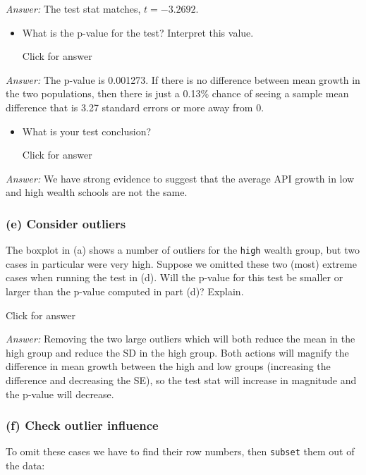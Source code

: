 \documentclass[
]{book}
\providecommand{\tightlist}{%
  \setlength{\itemsep}{0pt}\setlength{\parskip}{0pt}}
\begin{document}
\emph{Answer:} The test stat matches, \(t = -3.2692\).

\begin{itemize}
\tightlist
\item
  What is the p-value for the test? Interpret this value.

  Click for answer
\end{itemize}

\emph{Answer:} The p-value is 0.001273. If there is no difference between mean growth in the two populations, then there is just a 0.13\% chance of seeing a sample mean difference that is 3.27 standard errors or more away from 0.

\begin{itemize}
\tightlist
\item
  What is your test conclusion?

  Click for answer
\end{itemize}

\emph{Answer:} We have strong evidence to suggest that the average API growth in low and high wealth schools are not the same.

\hypertarget{e-consider-outliers}{%
\subsubsection{(e) Consider outliers}\label{e-consider-outliers}}

The boxplot in (a) shows a number of outliers for the \texttt{high} wealth group, but two cases in particular were very high. Suppose we omitted these two (most) extreme cases when running the test in (d). Will the p-value for this test be smaller or larger than the p-value computed in part (d)? Explain.

Click for answer

\emph{Answer:} Removing the two large outliers which will both reduce the mean in the high group and reduce the SD in the high group. Both actions will magnify the difference in mean growth between the high and low groups (increasing the difference and decreasing the SE), so the test stat will increase in magnitude and the p-value will decrease.

\hypertarget{f-check-outlier-influence}{%
\subsubsection{(f) Check outlier influence}\label{f-check-outlier-influence}}

To omit these cases we have to find their row numbers, then \texttt{subset} them out of the data:
\end{document}
